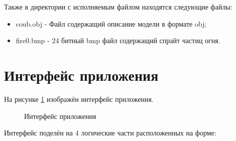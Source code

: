 \documentclass[a4paper,14pt]{report}
\begin{document}
Также в директории с исполняемым файлом находятся следующие файлы:
\begin{itemize}
 \item coub.obj - Файл содержащий описание модели в формате obj;
 \item fire0.bmp - 24 битный bmp файл содержащий спрайт частиц огня.
\end{itemize}
\section{Интерфейс приложения}
На рисунке \ref{fig:inter} изображён интерфейс приложения.
\begin{figure}[H]
 \caption{Интерфейс приложения}
 \label{fig:inter}
\end{figure}
Интерфейс поделён на 4 логические части расположенных на форме:
\end{document}
